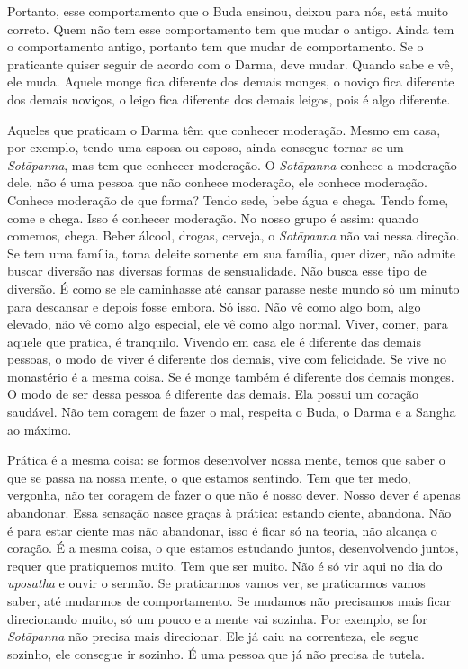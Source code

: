 Portanto, esse comportamento que o Buda ensinou, deixou para nós,
está muito correto. Quem não tem esse comportamento tem que mudar o
antigo. Ainda tem o comportamento antigo, portanto tem que mudar de
comportamento. Se o praticante quiser seguir de acordo com o Darma,
deve mudar. Quando sabe e vê, ele muda. Aquele monge fica diferente dos
demais monges, o noviço fica diferente dos demais noviços, o leigo fica
diferente dos demais leigos, pois é algo diferente. 

Aqueles que praticam o Darma têm que conhecer moderação. Mesmo em
casa, por exemplo, tendo uma esposa ou esposo, ainda consegue tornar-se
um \textit{Sot\=apanna}, mas tem que conhecer moderação. O
\textit{Sot\=apanna} conhece a moderação dele, não é uma pessoa que não
conhece moderação, ele conhece moderação. Conhece moderação de que
forma? Tendo sede, bebe água e chega. Tendo fome, come e chega. Isso é
conhecer moderação. No nosso grupo é assim: quando comemos, chega.
Beber álcool, drogas, cerveja, o \textit{Sot\=apanna} não vai nessa
direção. Se tem uma família, toma deleite somente em sua família, quer
dizer, não admite buscar diversão nas diversas formas de sensualidade.
Não busca esse tipo de diversão. É como se ele caminhasse até cansar
parasse neste mundo só um minuto para descansar e depois fosse embora.
Só isso. Não vê como algo bom, algo elevado, não vê como algo especial,
ele vê como algo normal. Viver, comer, para aquele que pratica, é
tranquilo. Vivendo em casa ele é diferente das demais pessoas, o modo
de viver é diferente dos demais, vive com felicidade. Se vive no
monastério é a mesma coisa. Se é monge também é diferente dos demais
monges. O modo de ser dessa pessoa é diferente das demais. Ela possui
um coração saudável. Não tem coragem de fazer o mal, respeita o Buda, o
Darma e a Sangha ao máximo. 

Prática é a mesma coisa: se formos desenvolver nossa mente, temos
que saber o que se passa na nossa mente, o que estamos sentindo. Tem
que ter medo, vergonha, não ter coragem de fazer o que não é nosso
dever. Nosso dever é apenas abandonar. Essa sensação nasce graças à
prática: estando ciente, abandona. Não é para estar ciente mas não
abandonar, isso é ficar só na teoria, não alcança o coração. É a mesma
coisa, o que estamos estudando juntos, desenvolvendo juntos, requer que
pratiquemos muito. Tem que ser muito. Não é só vir aqui no dia do
\textit{uposatha} e ouvir o sermão. Se praticarmos vamos ver, se
praticarmos vamos saber, até mudarmos de comportamento. Se mudamos não
precisamos mais ficar direcionando muito, só um pouco e a mente vai
sozinha. Por exemplo, se for \textit{Sot\=apanna} não precisa mais
direcionar. Ele já caiu na correnteza, ele segue sozinho, ele consegue
ir sozinho. É uma pessoa que já não precisa de tutela. 

